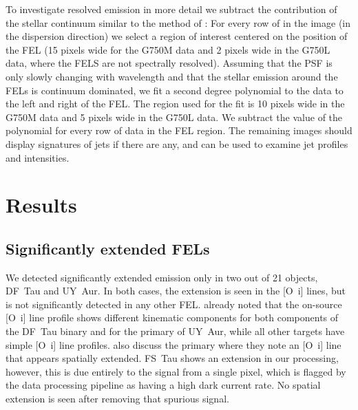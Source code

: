 \documentclass[twocolumn,trackchanges]{aastex63}
\begin{document}
To investigate resolved emission in more detail we subtract the contribution of
the stellar continuum similar to the method of \citet{2013A&A...550L...1S}: For
every row of in the image (in the dispersion direction) we select a region of
interest centered on the position of the FEL (15 pixels wide for the G750M data
and 2 pixels wide in the G750L data, where the FELS are not spectrally
resolved). Assuming that the PSF is only slowly changing with wavelength and
that the stellar emission around the FELs is continuum dominated, we fit a
second degree polynomial to the data to the left and right of the FEL. The
region used for the fit is 10 pixels wide in the G750M data and 5 pixels wide
in the G750L data. We subtract the value of the polynomial for every row of
data in the FEL region. The remaining images should display signatures of jets
if there are any, and can be used to examine jet profiles and intensities. 

\section{Results}
\label{sect:results}

\subsection{Significantly extended FELs}
We detected significantly extended emission only in two out of 21 objects,
DF~Tau and UY~Aur. In both cases, the extension is seen in the [O~{\sc i}]
lines, but is not significantly detected in any other
FEL. \citet{2003ApJ...583..334H} already noted that the on-source [O~{\sc i}]
line profile shows different kinematic components for both components of the
DF~Tau binary and for the primary of UY~Aur, while all other targets have
simple [O~{\sc i}] line profiles. \citet{2003ApJ...583..334H} also discuss the
 primary where they note an [O~{\sc i}] line that appears spatially
extended. FS~Tau shows an extension in our processing, however, this is due
entirely to the signal from a single pixel, which is flagged by the data
processing pipeline as having a high dark current rate. No spatial extension is seen after removing that spurious signal.

\end{document}
